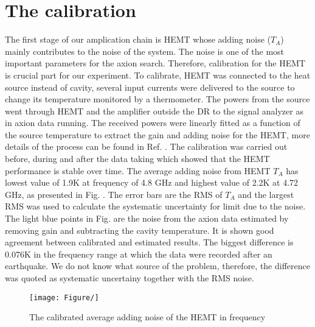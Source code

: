 \section{The calibration}
\label{sec:hemtcalibration}

The first stage of our amplication chain is HEMT whose adding noise ($T_A$) mainly contributes to the noise of the system. The noise is one of the most important parameters for the axion search. Therefore, calibration for the HEMT is crucial part for our experiment. To calibrate, HEMT was connected to the heat source instead of cavity, several input currents were delivered to the source to change its temperature monitored by a thermometer. The powers from the source went through HEMT and the amplifier outside the DR to the signal analyzer as in axion data running. The received powers were linearly fitted as a function of the source temperature to extract the gain and adding noise for the HEMT, more details of the process can be found in Ref. \cite{}. The calibration was carried out before, during and after the data taking which showed that the HEMT performance is stable over time. The average adding noise from HEMT $T_A$ has lowest value of 1.9K at frequency of 4.8 GHz and highest value of 2.2K at 4.72 GHz, as presented in Fig. \cite{}. The error bars are the RMS of $T_A$ and the largest RMS was used to calculate the systematic uncertainty for \gagg limit due to the noise. The light blue points in Fig. \cite{} are the noise from the axion data estimated by removing gain and subtracting the cavity temperature. It is shown good agreement between calibrated and estimated results. The biggest difference is 0.076K in the frequency range at which the data were recorded after an earthquake. We do not know what source of the problem, therefore, the difference was quoted as systematic uncertainy together with the RMS noise.

\begin{figure} [h]
  \centering
  \texttt{[image: Figure/]}
  \caption{The calibrated average adding noise of the HEMT in frequency}
\end{figure}


  

